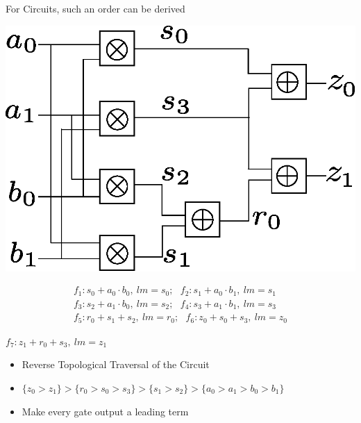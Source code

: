 \documentclass[xcolor=dvipsnames]{beamer}
\begin{document}
\begin{frame}{\large For Circuits, such an order can be derived}

\centerline{
\includegraphics[scale=0.4]{2bitmultiplier.eps}
}
\vspace{-0.3in}
\begin{align*}
f_1: s_0+a_0 \cdot b_0, \ lm=s_0; ~~~f_2: s_1+a_0 \cdot b_1, \ lm=s_1 \nonumber \\
f_3: s_2+a_1 \cdot b_0, \ lm=s_2; ~~~f_4: s_3+a_1 \cdot b_1, \ lm=s_3 \nonumber \\
f_5: r_0+s_1 + s_2 , \ lm=r_0; ~~~f_6: z_0+s_0 + s_3, \ lm=z_0\nonumber
\end{align*}
\vspace{-0.3in}
\begin{center}
$f_7: z_1+r_0 + s_3, \ lm=z_1$ %
\end{center}

\begin{itemize}
\item Reverse Topological Traversal of the Circuit
\item $\{z_0 > z_1\} > \{r_0 > s_0 > s_3 \} > \{s_1 > s_2 \}> \{a_0 >
  a_1 >  b_0 > b_1\}$
\item Make every gate output a leading term
\end{itemize}

\end{frame}
\end{document}
